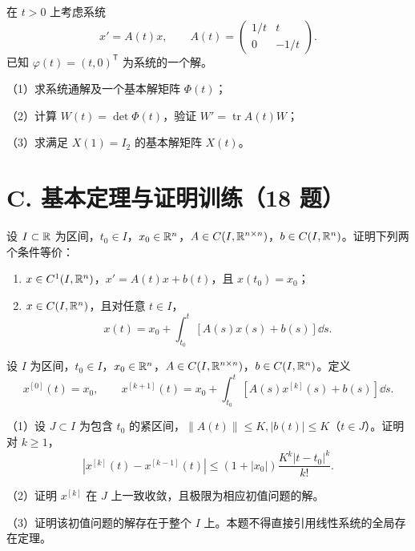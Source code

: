 \noindent\begin{minipage}{\linewidth}
在 $t>0$ 上考虑系统
\[x'=A(t)x,\qquad A(t)=\begin{pmatrix}1/t&t\\0&-1/t\end{pmatrix}.\]
已知 $\varphi(t)=(t,0)^{\mathsf T}$ 为系统的一个解。
\par（1）求系统通解及一个基本解矩阵 $\Phi(t)$；
\par（2）计算 $W(t)=\det\Phi(t)$，验证 $W'=\operatorname{tr}A(t)W$；
\par（3）求满足 $X(1)=I_2$ 的基本解矩阵 $X(t)$。
\end{minipage}\par\vspace{5pt}
\section{C. 基本定理与证明训练（18 题）}
\noindent\begin{minipage}{\linewidth}
设 $I\subset\mathbb R$ 为区间，$t_0\in I$，$x_0\in\mathbb R^n$，$A\in C(I,\mathbb R^{n\times n})$，$b\in C(I,\mathbb R^n)$。证明下列两个条件等价：
\begin{enumerate}[label=(\arabic*)]
\item $x\in C^1(I,\mathbb R^n)$，$x'=A(t)x+b(t)$，且 $x(t_0)=x_0$；
\item $x\in C(I,\mathbb R^n)$，且对任意 $t\in I$，
\[x(t)=x_0+\int_{t_0}^t[A(s)x(s)+b(s)]\dd s.\]
\end{enumerate}
\end{minipage}\par\vspace{5pt}
\noindent\begin{minipage}{\linewidth}
设 $I$ 为区间，$t_0\in I$，$x_0\in\mathbb R^n$，$A\in C(I,\mathbb R^{n\times n})$，$b\in C(I,\mathbb R^n)$。定义
\[x^{[0]}(t)=x_0,\qquad x^{[k+1]}(t)=x_0+\int_{t_0}^t[A(s)x^{[k]}(s)+b(s)]\dd s.\]
\par（1）设 $J\subset I$ 为包含 $t_0$ 的紧区间，$\|A(t)\|\le K,|b(t)|\le K$（$t\in J$）。证明对 $k\ge1$，
\[|x^{[k]}(t)-x^{[k-1]}(t)|\le(1+|x_0|)\frac{K^k|t-t_0|^k}{k!}.\]
\par（2）证明 $x^{[k]}$ 在 $J$ 上一致收敛，且极限为相应初值问题的解。
\par（3）证明该初值问题的解存在于整个 $I$ 上。本题不得直接引用线性系统的全局存在定理。
\end{minipage}\par\vspace{5pt}
